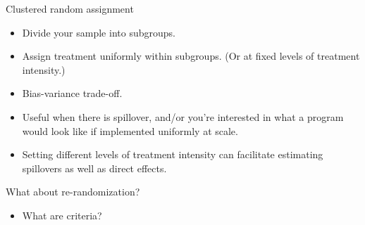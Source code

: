 \documentclass[xcolor={dvipsnames},handout]{beamer}
\begin{document}

\begin{frame}{Clustered random assignment}

\begin{itemize}
\item Divide your sample into subgroups.
\item Assign treatment uniformly within subgroups.  (Or at fixed levels of treatment intensity.)
\item Bias-variance trade-off.
\item Useful when there is spillover, and/or you're interested in what a program would look like if implemented uniformly at scale.
\item Setting different levels of treatment intensity can facilitate estimating spillovers as well as direct effects. \citep{baird2018optimal}
\end{itemize}

\end{frame}



\begin{frame}{What about re-randomization?}

\begin{itemize}
\item What are criteria?
\end{itemize}

\end{frame}


\end{document}
